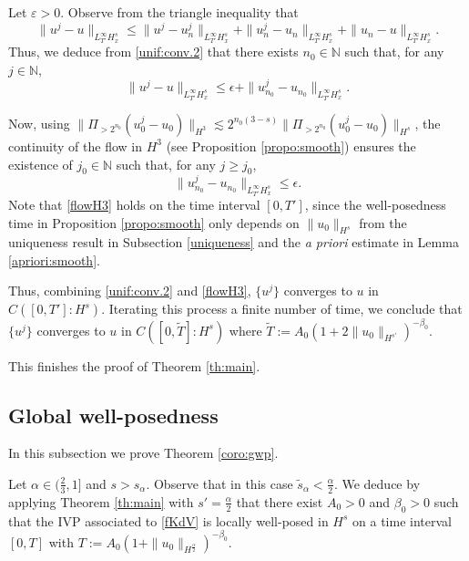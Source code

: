 \documentclass{amsart}
\theoremstyle{definition}
\theoremstyle{remark}
\numberwithin{equation}{section}
\begin{document}
Let $\varepsilon>0$. Observe from the triangle inequality that
\begin{equation*} 
\|u^j-u\|_{L^\infty_{T'}H^s_x} \le \|u^j-u_n^j\|_{L^\infty_{T'}H^s_x}+\|u_n^j-u_n\|_{L^\infty_{T'}H^s_x} + \|u_n-u\|_{L^\infty_{T'}H^s_x}. 
\end{equation*}
Thus, we deduce from \eqref{unif:conv.2} that there exists $n_0 \in \mathbb N$ such that, for any $j \in \mathbb N$, 
\begin{equation} \label{triangle}
\|u^j-u\|_{L^\infty_{T'}H^s_x} \leq \epsilon+\|u_{n_0}^j-u_{n_0}\|_{L^\infty_{T'}H^s_x} . 
\end{equation}
 
 Now, using $\|\Pi_{>2^{n_0}}(u_0^j-u_0)\|_{H^3} \lesssim 2^{n_0(3-s)} \|\Pi_{>2^{n_0}}(u_0^j-u_0)\|_{H^s}$, the continuity of the flow in $H^3$  (see Proposition \ref{propo:smooth}) ensures the existence of $j_0 \in \mathbb N$ such that, for any $j \ge j_0$,
 \begin{equation} \label{flowH3}
\|u_{n_0}^j-u_{n_0}\|_{L^\infty_{T'}H^s_x} \leq \epsilon . 
\end{equation}
Note that \eqref{flowH3} holds on the time interval $[0,T']$, since the well-posedness time in Proposition \ref{propo:smooth} only depends on $\|u_0\|_{H^s}$ from the uniqueness result in Subsection \ref{uniqueness} and the \emph{a priori} estimate in Lemma \ref{apriori:smooth}. 

Thus, combining \eqref{unif:conv.2} and \eqref{flowH3}, $\{u^j\}$ converges to $u$ in $C([0,T']:H^s)$. Iterating this process a finite number of time, we conclude that $\{u^j\}$ converges to $u$ in $C([0,\widetilde{T}]:H^s)$ where $\widetilde{T}:=A_0 (1+2\|u_0\|_{H^{s'}})^{-\beta_0}$.

\medskip 
This finishes the proof of Theorem \ref{th:main}. 

\subsection{Global well-posedness} In this subsection we prove Theorem \ref{coro:gwp}. 

Let $\alpha \in (\frac23,1]$ and $s>s_\alpha$. Observe that in this case $\widetilde{s}_\alpha <\frac{\alpha}2$. We deduce by applying Theorem \ref{th:main} with $s'=\frac{\alpha}2$ that there exist $A_0>0$ and $\beta_0>0$ such that the IVP associated to \eqref{fKdV} is locally well-posed in $H^s$ on a time interval $[0,T]$ with $T:=A_0 (1+\|u_0\|_{H^{\frac\alpha2}})^{-\beta_0}$. 
\end{document}
